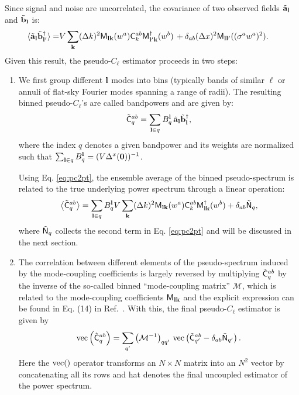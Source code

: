 \documentclass[a4paper,11pt]{article}
\begin{document}
      Since signal and noise are uncorrelated, the covariance of two observed fields $\tilde{\bf a}_{\bf l}$ and $\tilde{\bf b}_{\bf l}$ is:
      \begin{align}\label{eq:pc2pt}
        \langle \tilde{\bf a}_{\bf l}\tilde{\bf b}^\dagger_{{\bf l}'}\rangle=&V\sum_{\bf k} (\Delta k)^2 {\sf M}_{{\bf l}{\bf k}}(w^a){\sf C}^{ab}_k{\sf M}^\dagger_{{\bf l}'{\bf k}}(w^b)\,+\delta_{ab}(\Delta x)^2{\sf M}_{{\bf l}{\bf l}'}((\sigma^aw^a)^2).
      \end{align}
      Given this result, the pseudo-$C_\ell$ estimator proceeds in two steps:
      \begin{enumerate}
        \item We first group different ${\bf l}$ modes into bins (typically bands of similar $\ell$ or annuli of flat-sky Fourier modes spanning a range of radii). The resulting binned pseudo-$C_\ell$'s are called bandpowers and are given by:
        \begin{equation}\label{eq:bandpowers}
          \tilde{\sf C}^{ab}_q=\sum_{{\bf l}\in q} B_q^{\bf l}\,\tilde{\bf a}_{\bf l}\tilde{\bf b}^\dag_{\bf l},
        \end{equation}
        where the index $q$ denotes a given bandpower and its weights are normalized such that $\sum_{{\bf l}\in q}B_q^{\bf l}=(V\Delta^x({\bf 0}))^{-1}$.
        
        Using Eq. \ref{eq:pc2pt}, the ensemble average of the binned pseudo-spectrum is related to the true underlying power spectrum through a linear operation:
        \begin{equation}
          \left\langle \tilde{\sf C}^{ab}_q\right\rangle=\sum_{{\bf l}\in q} B_q^{\bf l}V\sum_{\bf k} (\Delta k)^2 {\sf M}_{{\bf l}{\bf k}}(w^a){\sf C}^{ab}_k{\sf M}^\dagger_{{\bf l}{\bf k}}(w^b)+\delta_{ab}\tilde{\sf N}_q,
        \end{equation}
        where $\tilde{\sf N}_q$ collects the second term in Eq. \ref{eq:pc2pt} and will be discussed in the next section. 
        \item The correlation between different elements of the pseudo-spectrum induced by the mode-coupling coefficients is largely reversed by multiplying $\tilde{\sf C}^{ab}_q$ by the inverse of the so-called binned ``mode-coupling matrix'' $\mathcal{M}$, which is related to the mode-coupling coefficients ${\sf M}_{{\bf l}{\bf k}}$ and the explicit expression can be found in Eq. (14) in Ref.~\cite{1809.09603}. With this, the final pseudo-$C_\ell$ estimator is given by
        \begin{equation}\label{eq:decouple}
          {\rm vec}\left(\hat{\sf C}^{ab}_q\right) = \sum_{q'}\left(\mathcal{M}^{-1}\right)_{qq'}\,{\rm vec}\left(\tilde{\sf C}^{ab}_{q'}-\delta_{ab}\tilde{\sf N}_{q'}\right).
        \end{equation}
        Here the ${\rm vec}()$ operator transforms an $N\times N$ matrix into an $N^2$ vector by concatenating all its rows and hat denotes the final uncoupled estimator of the power spectrum.
        

\end{enumerate}
\end{document}
